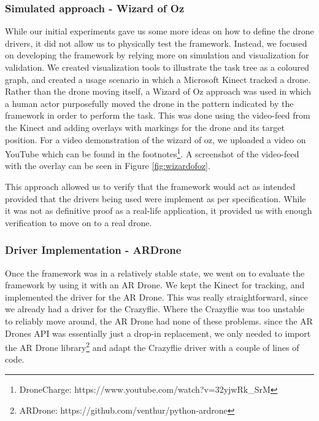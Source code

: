 \subsubsection{Simulated approach - Wizard of Oz}
While our initial experiments gave us some more ideas on how to define the drone drivers, it did not allow us to physically test the framework. Instead, we focused on developing the framework by relying more on simulation and visualization for validation. We created visualization tools to illustrate the task tree as a coloured graph, and created a usage scenario in which a Microsoft Kinect tracked a drone. Rather than the drone moving itself, a Wizard of Oz approach was used in which a human actor purposefully moved the drone in the pattern indicated by the framework in order to perform the task. This was done using the video-feed from the Kinect and adding overlays with markings for the drone and its target position. For a video demonstration of the wizard of oz, we uploaded a video on YouTube which can be found in the footnotes\footnote{DroneCharge: https://www.youtube.com/watch?v=32yjwRk\_SrM}. A screenshot of the video-feed with the overlay can be seen in Figure \ref{fig:wizardofoz}.

This approach allowed us to verify that the framework would act as intended provided that the drivers being used were implement as per specification.  While it was not as definitive proof as a real-life application, it provided us with enough verification to move on to a real drone.

\subsubsection{Driver Implementation - ARDrone}
Once the framework was in a relatively stable state, we went on to evaluate the framework by using it with an AR Drone. We kept the Kinect for tracking, and implemented the driver for the AR Drone. This was really straightforward, since we already had a driver for the Crazyflie. Where the Crazyflie was too unstable to reliably move around, the AR Drone had none of these problems. since the AR Drones API was essentially just a drop-in replacement, we only needed to import the AR Drone library\footnote{ARDrone: https://github.com/venthur/python-ardrone} and adapt the Crazyflie driver with a couple of lines of code.

